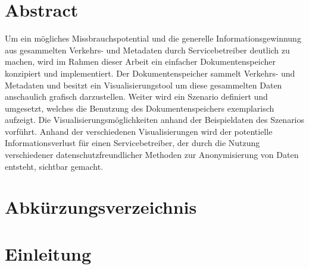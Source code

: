 \documentclass[
    fontsize=12pt,
    headings=small,
    parskip=half,           %
    bibliography=totoc,
    numbers=noenddot,       %
    open=any,               %
    ]{scrreprt}
\begin{document}
\chapter*{Abstract}
Um ein mögliches Missbrauchspotential und die generelle Informationsgewinnung aus gesammelten Verkehrs- und Metadaten durch Servicebetreiber deutlich zu machen, wird im Rahmen dieser Arbeit ein einfacher Dokumentenspeicher konzipiert und implementiert.
Der Dokumentenspeicher sammelt Verkehrs- und Metadaten und besitzt ein Visualisierungstool um diese gesammelten Daten anschaulich grafisch darzustellen.
Weiter wird ein Szenario definiert und umgesetzt, welches die Benutzung des Dokumentenspeichers exemplarisch aufzeigt.
Die Visualisierungsmöglichkeiten anhand der Beispieldaten des Szenarios vorführt.
Anhand der verschiedenen Visualisierungen wird der potentielle Informationsverlust für einen Servicebetreiber, der durch die Nutzung verschiedener datenschutzfreundlicher Methoden zur Anonymisierung von Daten entsteht, sichtbar gemacht. 

\tableofcontents
\listoffigures
\chapter*{Abkürzungsverzeichnis}
\begin{acronym}[style=nextline]
\end{acronym}

\chapter{Einleitung} \label{Kap:Einleitung}
\end{document}
